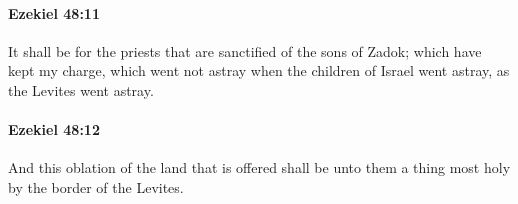 		\paragraph{Ezekiel 48:11} %
			\label{EZEKIEL-48-11}

			It shall be for the priests that are sanctified of the sons of Zadok; which have kept my charge, which went not astray when the children of Israel went astray, as the Levites went astray.


		\paragraph{Ezekiel 48:12} %
			\label{EZEKIEL-48-12}

			And this oblation of the land that is offered shall be unto them a thing most holy by the border of the Levites.


